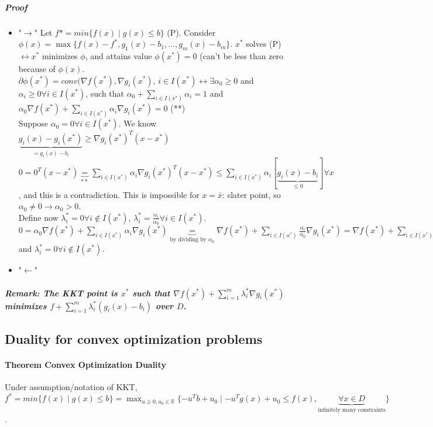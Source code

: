 \documentclass[main]{subfiles}
\begin{document}
\subparagraph{Proof}
\begin{itemize}
\item "$\rightarrow$"
\subitem Let $f{*} = min \{ f(x) \mid g(x) \leq b \}$ (P). Consider $\phi (x) =
\max \{ f(x) - f^{*}, g_{1}(x)-b_{1}, \dots, g_{m}(x)-b_{m} \}$. $x^{*}$ solves
(P) $\leftrightarrow x^{*}$ minimizes $\phi$, and attains value $\phi (x^{*})
=0$ (can't be less than zero because of $\phi(x)$.\\
$\partial \phi (x^{*}) = conv(\nabla f(x^{*}), \nabla g_{i}(x^{*})$, $i \in
I(x^{*}) \leftrightarrow \exists \alpha_{0} \geq 0$ and $\alpha_{i} \geq 0
\forall i \in I(x^{*})$, such that $\alpha_{0} + \sum_{i \in I(x^{*})}
\alpha_{i} = 1$ and $\alpha_{0} \nabla f(x^{*}) + \sum_{i \in I(x^{*})}
\alpha_{i} \nabla g_{i}(x^{*}) = 0$ (**) \\
Suppose $\alpha_{0} = 0 \forall i \in I(x^{*})$. We know $\underbrace{g_{i}(x)
- g_{i}(x^{*})}_{= g_{i}(x) -b_{i}} \geq \nabla g_{i}(x^{*})^{T}(x - x^{*})$\\
$0 = 0^{T}(x-x^{*}) \underbrace{=}_{**} \sum_{i \in I(x^{*})} \alpha_{i} \nabla
g_{i}(x^{*})^{T}(x-x^{*}) \leq \sum_{i \in I(x^{*})} \alpha_{i}
[\underbrace{g_{i}(x)-b_{i}}_{\leq 0}] \forall x$, and this is a contradiction.
This is impossible for $x = \bar{x}$: slater point, so $\alpha_{0} \neq 0
\rightarrow \alpha_{0} > 0$.\\
Define now $\lambda_{i}^{*} = 0 \forall i \notin I(x^{*})$, $\lambda_{i}^{*} =
\frac{\alpha_{i}}{\alpha_{0}} \forall i \in I(x^{*})$.
$0 = \alpha_{0} \nabla f(x^{*}) + \sum_{i \in I(x^{*})} \alpha_{i} \nabla
g_{i}(x^{*}) \underbrace{=}_{\text{by dividing by $\alpha_0$}} \nabla f(x^{*})
+ \sum_{i \in I(x^{*})} \frac{\alpha_{i}}{\alpha_{0}}\nabla g_{i}(x^{*}) =
\nabla f(x^{*}) + \sum_{i \in I(x^{*})} \lambda_{i}^{*} \nabla g_{i}(x^{*})$
and $ \lambda_{i}^{*} = 0 \forall i \notin I(x^{*})$.
\item "$\leftarrow$"
\end{itemize}


\subparagraph{Remark: The KKT point is $x^{*}$ such that $\nabla f(x^{*}) +
\sum_{i=1}^{m} \lambda_{i}^{*} \nabla g_{i}(x^{*})$ minimizes
$f + \sum_{i=1}^{m} \lambda_{i}^{*} (g_{i}(x) - b_{i})$ over $D$.}

\subsection{Duality for convex optimization problems}

\paragraph{Theorem Convex Optimization Duality}
Under assumption/notation of KKT, $f^{*} = min \{ f(x) \mid g(x) \leq b \} =
\displaystyle \max_{u \geq 0, u_{0} \in \mathbb{R}} \{-u^{T}b + u_{0}
\mid -u^{T}g(x) + u_{0} \leq f(x), \underbrace{\forall x \in D}
_{\text{infinitely many constraints}} \}$.
\end{document}

